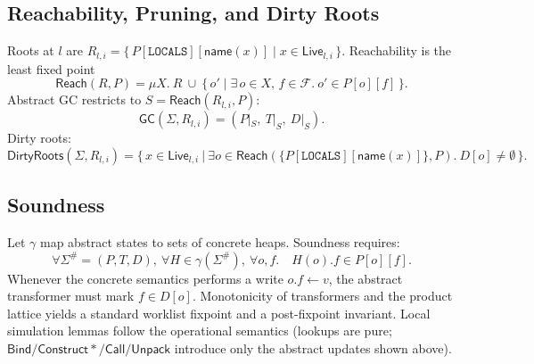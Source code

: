 \subsection{Reachability, Pruning, and Dirty Roots}

Roots at \(l\) are
\(R_{l,i}=\{\,P[\mathtt{LOCALS}][\mathsf{name}(x)] \mid x\in \mathsf{Live}_{l,i}\,\}\).
Reachability is the least fixed point
\[
\mathsf{Reach}(R,P)=\mu X.\ R\ \cup\ \{\,o' \mid \exists\,o\in X,\, f\in\mathcal{F}.\ o'\in P[o][f] \,\}.
\]
Abstract GC restricts to \(S=\mathsf{Reach}(R_{l,i},P)\):
\[
\mathsf{GC}(\Sigma,R_{l,i})=(P|_S,\ T|_S,\ D|_S).
\]
Dirty roots:
\[
\mathsf{DirtyRoots}(\Sigma,R_{l,i})=\big\{\, x\in \mathsf{Live}_{l,i}\ \big|\ \exists o\in \mathsf{Reach}(\{P[\mathtt{LOCALS}][\mathsf{name}(x)]\},P).\ D[o]\neq \emptyset \,\big\}.
\]

\subsection{Soundness}

Let \(\gamma\) map abstract states to sets of concrete heaps. Soundness requires:
\[
\forall \Sigma^\#=(P,T,D),\ \forall H\in \gamma(\Sigma^\#),\ \forall o,f.\quad H(o).f \in P[o][f].
\]
Whenever the concrete semantics performs a write \(o.f\leftarrow v\), the abstract transformer must
mark \(f\in D[o]\). Monotonicity of transformers and the product lattice yields a standard
worklist fixpoint and a post-fixpoint invariant. Local simulation lemmas follow the \spytecode
operational semantics (lookups are pure; \(\mathsf{Bind}/\mathsf{Construct*}/\mathsf{Call}/\mathsf{Unpack}\) introduce only the abstract updates shown above).
